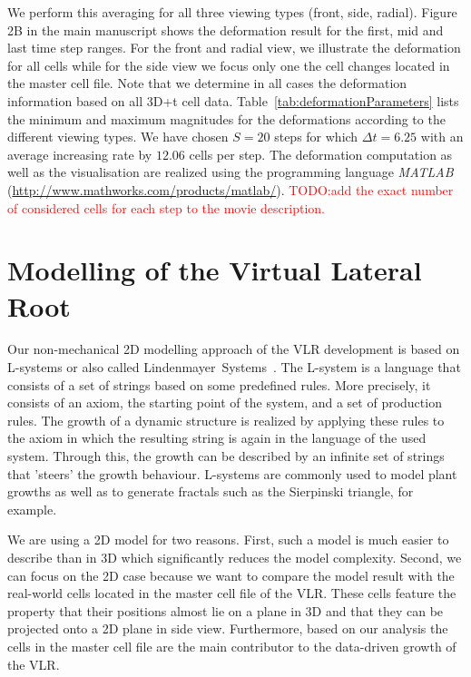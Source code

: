 \documentclass[11pt,a4paper, final]{article}
\newcommand{\TODO}[1]{
\textcolor{red}{TODO:#1}
}
\begin{document}
We perform this averaging for all three viewing types (front, side, radial). Figure 2B in the main manuscript shows the deformation result for the first, mid and last time step ranges. For the front and radial view, we illustrate the deformation for all cells while for the side view we focus only one the cell changes located in the master cell file. Note that we determine in all cases the deformation information based on all 3D+t cell data. Table~\ref{tab:deformationParameters} lists the minimum and maximum magnitudes for the deformations according to the different viewing types. We have chosen $S=20$ steps for which $\Delta t = 6.25$ with an average increasing rate by $12.06$ cells per step. The deformation computation as well as the visualisation are realized using the programming language \textit{MATLAB} (\href{http://www.mathworks.com/products/matlab/}{http://www.mathworks.com/products/matlab/}). \TODO{add the exact number of considered cells for each step to the movie description.}

\clearpage
\section{Modelling of the Virtual Lateral Root}
\noindent
Our non-mechanical 2D modelling approach of the VLR development is based on L-systems or also called Lindenmayer~Systems~\cite{lindenmayer_1968, prusinkiewicz_lindenmayer_1990}. The L-system is a language that consists of a set of strings based on some predefined rules. More precisely, it consists of an axiom, the starting point of the system, and a set of production rules. The growth of a dynamic structure is realized by applying these rules to the axiom in which the resulting string is again in the language of the used system. Through this, the growth can be described by an infinite set of strings that 'steers' the growth behaviour. L-systems are commonly used to model plant growths as well as to generate fractals such as the Sierpinski triangle, for example.

We are using a 2D model for two reasons. First, such a model is much easier to describe than in 3D which significantly reduces the model complexity. Second, we can focus on the 2D case because we want to compare the model result with the real-world cells located in the master cell file of the VLR. These cells feature the property that their positions almost lie on a plane in 3D and that they can be projected onto a 2D plane in side view. Furthermore, based on our analysis the cells in the master cell file are the main contributor to the data-driven growth of the VLR.
\end{document}
